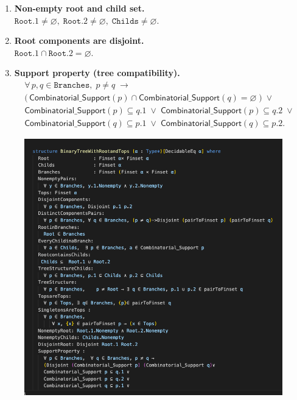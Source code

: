 \documentclass[11pt]{amsart}
\theoremstyle{remark}            %
\newcommand{\supp}{\mathsf{Combinatorial\_Support}}
\begin{document}
\begin{enumerate}[label=\textbf{(\arabic*)},leftmargin=1.5em]
  \item \textbf{Non-empty root and child set.}\\
        $\texttt{Root}.1\neq\varnothing,\;
        \texttt{Root}.2\neq\varnothing,\;
        \texttt{Childs}\neq\varnothing$.

  \item \textbf{Root components are disjoint.}\\
        $\texttt{Root}.1\cap\texttt{Root}.2=\varnothing$.

  \item \textbf{Support property (tree compatibility).}\\
      \begin{align*} \forall\,p,q\in\texttt{Branches},\; p\neq q\;\to \\
        \bigl(\, \supp(p)\cap\supp(q)=\varnothing\;\bigl)\;\lor\; \\ 
        \supp(p)\subseteq q.1\;\lor\;\supp(p)\subseteq q.2\;\lor\; \\
        \supp(q)\subseteq p.1\;\lor\;\supp(q)\subseteq p.2.
   \end{align*} 
\end{enumerate}
\newpage 
\begin{figure}[t]             %
  \centering                     %
  \includegraphics[width=0.99\linewidth]{tree.png} %
\end{figure}
\end{document}
